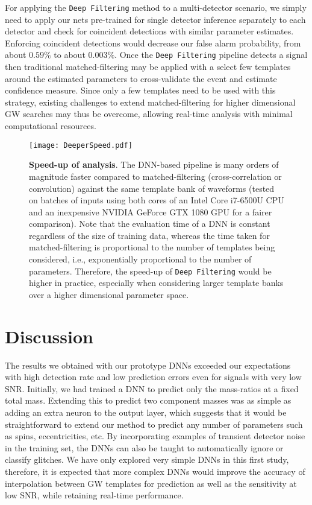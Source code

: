\documentclass[aps,prd,%
amsmath,floats,floatfix, twocolumn, superscriptaddress,nofootinbib,showpacs]{revtex4-1}
\begin{document}
For applying the \texttt{Deep Filtering} method to a multi-detector scenario, we simply need to apply our nets pre-trained for single detector inference separately to each detector and check for coincident detections with similar parameter estimates. Enforcing coincident detections would decrease our false alarm probability, from about $0.59\%$ to about $0.003\%$. Once the \texttt{Deep Filtering} pipeline detects a signal then traditional matched-filtering may be applied with a select few templates around the estimated parameters to cross-validate the event and estimate confidence measure. Since only a few templates need to be used with this strategy, existing challenges to extend matched-filtering for higher dimensional GW searches may thus be overcome, allowing real-time analysis with minimal computational resources.


\begin{figure}
	\centering
	\texttt{[image: DeeperSpeed.pdf]}
	\caption{\textbf{Speed-up of analysis}. The DNN-based pipeline is many orders of magnitude faster compared to matched-filtering (cross-correlation or convolution) against the same template bank of waveforms (tested on batches of inputs using both cores of an Intel Core i7-6500U CPU and an inexpensive NVIDIA GeForce GTX 1080 GPU for a fairer comparison). Note that the evaluation time of a DNN is constant regardless of the size of training data, whereas the time taken for matched-filtering is proportional to the number of templates being considered, i.e., exponentially proportional to the number of parameters. Therefore, the speed-up of \texttt{Deep Filtering} would be higher in practice, especially when considering larger template banks over a higher dimensional parameter space.}
	\label{fig:speed}
\end{figure}	


\section{Discussion}
\label{disc}

The results we obtained with our prototype DNNs exceeded our expectations with high detection rate and low prediction errors even for signals with very low SNR. Initially, we had trained a DNN to predict only the mass-ratios at a fixed total mass. Extending this to predict two component masses was as simple as adding an extra neuron to the output layer, which suggests that it would be straightforward to extend our method to predict any number of parameters such as spins, eccentricities, etc. By incorporating examples of transient detector noise in the training set, the DNNs can also be taught to automatically ignore or classify glitches. We have only explored very simple DNNs in this first study, therefore, it is expected that more complex DNNs would improve the accuracy of interpolation between GW templates for prediction as well as the sensitivity at low SNR, while retaining real-time performance.
\end{document}
